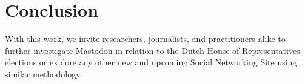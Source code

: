 \section{Conclusion}

With this work, we invite researchers, journalists, and practitioners alike to further investigate Mastodon in relation to the Dutch House of Representatives elections or explore any other new and upcoming Social Networking Site using similar methodology.